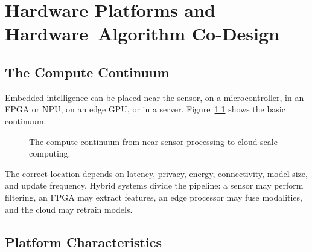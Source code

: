 \chapter{Hardware Platforms and Hardware--Algorithm Co-Design}
\label{chap:codesign}

\section{The Compute Continuum}

Embedded intelligence can be placed near the sensor, on a microcontroller, in an FPGA or NPU, on an edge GPU, or in a server. Figure~\ref{fig:compute-continuum} shows the basic continuum.

\begin{figure}[H]
    \centering
    \resizebox{\textwidth}{!}{}
    \caption{The compute continuum from near-sensor processing to cloud-scale computing.}
    \label{fig:compute-continuum}
\end{figure}

The correct location depends on latency, privacy, energy, connectivity, model size, and update frequency. Hybrid systems divide the pipeline: a sensor may perform filtering, an FPGA may extract features, an edge processor may fuse modalities, and the cloud may retrain models.

\section{Platform Characteristics}

